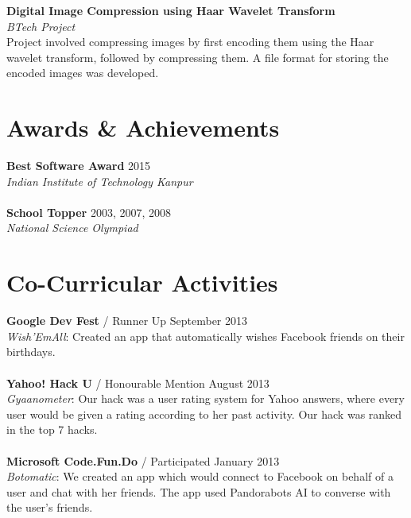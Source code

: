 \documentclass[margin,line]{res}
\begin{document}
\begin{resume}
{\bf Digital Image Compression using Haar Wavelet Transform} \\
{\em BTech Project} \\
Project involved compressing images by first encoding them using the Haar wavelet transform, followed by compressing them. A file format for storing the encoded images was developed. 

\section{\sc Awards \& Achievements}

{\bf Best Software Award} {\hfill} 2015 \\
{\em Indian Institute of Technology Kanpur} \\
\\
{\bf School Topper} {\hfill} 2003, 2007, 2008 \\
{\em National Science Olympiad} \\

\section{\sc Co-Curricular Activities}

{\bf Google Dev Fest} / Runner Up {\hfill} September 2013 \\
{\em Wish’EmAll}: Created an app that automatically wishes Facebook friends on their birthdays. \\
\\
{\bf Yahoo! Hack U} / Honourable Mention {\hfill} August 2013 \\
{\em Gyaanometer}: Our hack was a user rating system for Yahoo answers, where every user would be given a rating according to her past activity. Our hack was ranked in the top 7 hacks. \\
\\
{\bf Microsoft Code.Fun.Do} / Participated {\hfill} January 2013 \\
{\em Botomatic}: We created an app which would connect to Facebook on behalf of a user and chat with her friends. The app used Pandorabots AI to converse with the user’s friends.

\end{resume}
\end{document}
